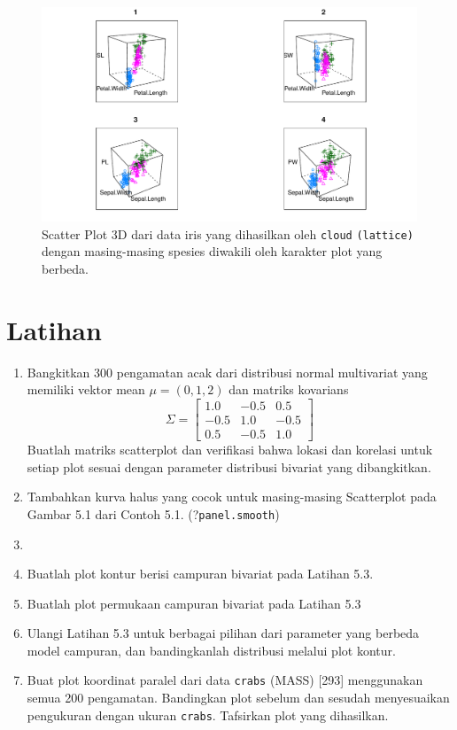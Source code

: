 \documentclass[a4paper,12pt]{article}
\theoremstyle{definition}
\begin{document}
\begin{figure}[H]
    \centering
    \includegraphics[width=16cm]{gb/K2G6-Scatterplot.pdf}
    \caption{Scatter Plot 3D dari data iris yang dihasilkan oleh \texttt{cloud} \texttt{(lattice)} dengan masing-masing spesies diwakili oleh karakter plot yang berbeda.}
    \label{fig:my_label}
\end{figure}



\section{Latihan}
\begin{enumerate}
\item Bangkitkan 300 pengamatan acak dari distribusi normal multivariat yang memiliki vektor mean $\mu = (0, 1, 2)$ dan matriks kovarians
\[
\Sigma = \begin{bmatrix}
1.0 & -0.5 & 0.5\\ 
-0.5 & 1.0 & -0.5\\ 
0.5 & -0.5 & 1.0
\end{bmatrix}
\]
Buatlah matriks scatterplot dan verifikasi bahwa lokasi dan korelasi untuk setiap plot sesuai dengan parameter distribusi bivariat yang dibangkitkan.

\item
Tambahkan kurva halus yang cocok untuk masing-masing Scatterplot pada Gambar 5.1 dari
Contoh 5.1. (?\texttt{panel.smooth})
\item

\item Buatlah plot kontur berisi campuran bivariat pada Latihan 5.3.
\item Buatlah plot permukaan campuran bivariat pada Latihan 5.3
\item Ulangi Latihan 5.3 untuk berbagai pilihan dari parameter yang berbeda
model campuran, dan bandingkanlah distribusi melalui plot kontur.
\item Buat plot koordinat paralel dari data \texttt{crabs} (MASS) [293] menggunakan
semua 200 pengamatan. Bandingkan plot sebelum dan sesudah menyesuaikan
pengukuran dengan ukuran \texttt{crabs}. Tafsirkan plot yang dihasilkan.





\end{enumerate}



\newpage
\printbibliography[heading=bibintoc,title={Daftar Pustaka}]
\end{document}

